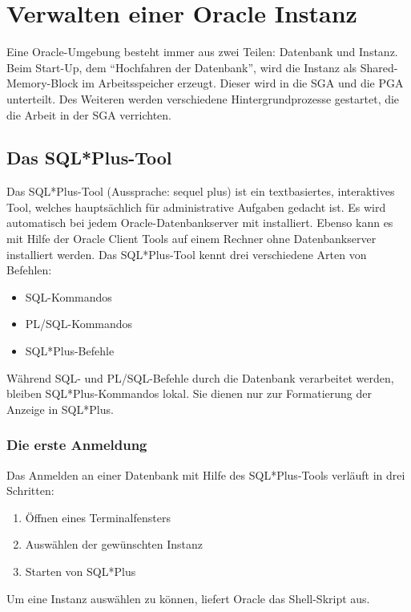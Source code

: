 \chapter{Verwalten einer Oracle Instanz}
  \chaptertoc{}
  \cleardoubleevenpage
    Eine Oracle-Umgebung besteht immer aus zwei Teilen: Datenbank und Instanz.
    Beim Start-Up, dem \enquote{Hochfahren der Datenbank}, wird die Instanz als
    Shared-Memory-Block im Arbeitsspeicher erzeugt. Dieser wird in die SGA und
    die PGA unterteilt. Des Weiteren werden verschiedene Hintergrundprozesse
    gestartet, die die Arbeit in der SGA verrichten.
    \section{Das SQL*Plus-Tool}
      Das SQL*Plus-Tool (Aussprache: sequel plus) ist ein textbasiertes, interaktives Tool, welches hauptsächlich für administrative Aufgaben gedacht ist. Es wird automatisch bei jedem Oracle-Datenbankserver mit installiert. Ebenso kann es mit Hilfe der Oracle Client Tools auf einem Rechner ohne Datenbankserver installiert werden.
      Das SQL*Plus-Tool kennt drei verschiedene Arten von Befehlen:
      \begin{itemize}
        \item SQL-Kommandos
        \item PL/SQL-Kommandos
        \item SQL*Plus-Befehle
      \end{itemize}
      Während SQL- und PL/SQL-Befehle durch die Datenbank verarbeitet werden,
      bleiben SQL*Plus-Kommandos lokal. Sie dienen nur zur Formatierung der
      Anzeige in SQL*Plus.
\clearpage	  
      \subsection{Die erste Anmeldung}
        Das Anmelden an einer Datenbank mit Hilfe des SQL*Plus-Tools verläuft
        in drei Schritten:
        \begin{enumerate}
          \item Öffnen eines Terminalfensters
          \item Auswählen der gewünschten Instanz
          \item Starten von SQL*Plus
        \end{enumerate}
        Um eine Instanz auswählen zu können, liefert Oracle das Shell-Skript
         aus.

